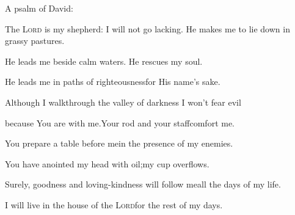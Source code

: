 
\begin{inparaenum}
  \noindent{} A psalm of David:\smallskip%
  
  \pc The \textsc{Lord} is my shepherd: I will not go lacking.\pa {} He makes me to lie down in grassy pastures.%
  
  \pc He leads me beside calm waters.\pa {} He rescues my soul.%
  
  \pc He leads me in paths of righteousness\pa for His name's sake.%
  
  \pb {} Although I walk\pa through the valley of darkness%
  \pa I won't fear evil%
  
  \pc because You are with me.\pa Your rod and your staff\pa comfort me.%
  
  \pb {} You prepare a table before me\pa in the presence of my enemies.%
  
  \pc You have anointed my head with oil;\pa my cup overflows.%
  
  \pb {} Surely, goodness and loving-kindness%
  will follow me\pa all the days of my life.%
  
  \pc I will live in the house of the \textsc{Lord}\pa for the rest of my days.%
\end{inparaenum}
